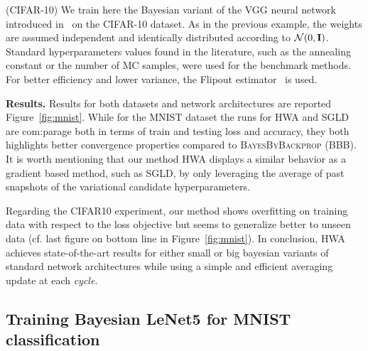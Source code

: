 \documentclass{article} %
\begin{document}
(CIFAR-10) We train here the Bayesian variant of the VGG neural network introduced in~\citep{simonyan2014very} on the CIFAR-10 dataset.
As in the previous example, the weights are assumed  independent and identically distributed according to ${\cal N}(0,\Id)$.
Standard hyperparameters values found in the literature, such as the annealing constant or the number of MC samples, were used for the benchmark methods. 
For better efficiency and lower variance, the Flipout estimator~\citep{wen2018flipout} is used.

\textbf{Results.} \hspace{0.1in} 
Results for both datasets and network architectures are reported Figure~\ref{fig:mnist}.
While for the MNIST dataset the runs for \textsc{HWA} and \textsc{SGLD} are com:parage both in terms of train and testing loss and accuracy, they both highlights better convergence properties compared to \textsc{BayesByBackprop} (BBB).
It is worth mentioning that our method \textsc{HWA} displays a similar behavior as a gradient based method, such as \textsc{SGLD}, by only leveraging the average of past snapshots of the variational candidate hyperparameters. 

Regarding the CIFAR10 experiment, our method shows overfitting on training data with respect to the loss objective but seems to generalize better to unseen data (cf. last figure on bottom line in Figure~\ref{fig:mnist}).
In conclusion, \textsc{HWA} achieves state-of-the-art results for either small or big bayesian variants of standard network architectures while using a simple and efficient averaging update at each \textit{cycle}.


\subsection{Training Bayesian LeNet5 for MNIST classification}

\end{document}
